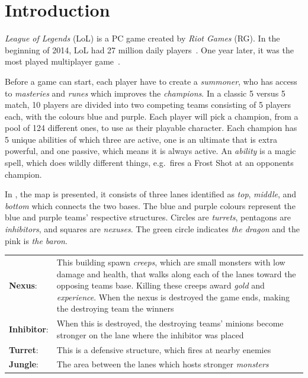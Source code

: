 \section{Introduction}\label{sec:intro}


\emph{League of Legends} (LoL) is a PC game created by \emph{Riot Games} (RG). In the beginning of 2014, LoL had 27 million daily players~\cite{LoL27mill}. One year later, it was the most played multiplayer game~\cite{LoLmostplayed}.

Before a game can start, each player have to create a \emph{summoner}, who has access to \emph{masteries} and \emph{runes} which improves the \emph{champions}. In a classic 5 versus 5 match, 10 players are divided into two competing teams consisting of 5 players each, with the colours blue and purple. Each player will pick a champion, from a pool of 124 different ones, to use as their playable character. Each champion has 5 unique abilities of which three are active, one is an ultimate that is extra powerful, and one passive, which means it is always active. An \emph{ability} is a magic spell, which does wildly different things, e.g.\ fires a Frost Shot at an opponents champion. 

In , the map is presented, it consists of three lanes identified as \emph{top}, \emph{middle}, and \emph{bottom} which connects the two bases. The blue and purple colours represent the blue and purple teams' respective structures. Circles are \emph{turrets}, pentagons are \emph{inhibitors}, and squares are \emph{nexuses}. The green circle indicates \emph{the dragon} and the pink is \emph{the baron}.

\begin{table}[!h]
  \begin{tabular}{l p{13cm}}
    \textbf{Nexus}: & This building spawn \emph{creeps}, which are small monsters with low damage and health, that walks along each of the lanes toward the opposing teams base. Killing these creeps award \emph{gold} and \emph{experience}. When the nexus is destroyed the game ends, making the destroying team the winners\\
    \textbf{Inhibitor}: & When this is destroyed, the destroying teams' minions become stronger on the lane where the inhibitor was placed\\
    \textbf{Turret}: & This is a defensive structure, which fires at nearby enemies\\
    \textbf{Jungle}: & The area between the lanes which hosts stronger \emph{monsters}\\
  \end{tabular}
\end{table}

